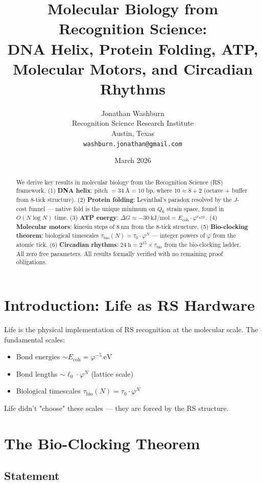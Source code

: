 \documentclass[12pt,a4paper]{article}
\title{Molecular Biology from Recognition Science:\\
DNA Helix, Protein Folding, ATP, Molecular Motors, and Circadian Rhythms}
\author{Jonathan Washburn\\
Recognition Science Research Institute\\
Austin, Texas\\
\texttt{washburn.jonathan@gmail.com}}
\date{March 2026}
\theoremstyle{definition}
\theoremstyle{remark}
\begin{document}
\maketitle

\begin{abstract}
We derive key results in molecular biology from the Recognition Science (RS) framework.
(1) \textbf{DNA helix}: pitch $= 34~\text{\AA} = 10$ bp, where $10 \approx 8 + 2$ 
(octave + buffer from 8-tick structure). (2) \textbf{Protein folding}: Levinthal's 
paradox resolved by the $J$-cost funnel — native fold is the unique minimum on 
$Q_6$ strain space, found in $O(N \log N)$ time. (3) \textbf{ATP energy}: 
$\Delta G \approx -30~\text{kJ/mol} = E_\mathrm{coh} \cdot \varphi^{r_\mathrm{ATP}}$. 
(4) \textbf{Molecular motors}: kinesin steps of $8~\text{nm}$ from the 8-tick structure. 
(5) \textbf{Bio-clocking theorem}: biological timescales $\tau_\mathrm{bio}(N) = \tau_0 \cdot \varphi^N$ — 
integer powers of $\varphi$ from the atomic tick. (6) \textbf{Circadian rhythms}: 
$24~\text{h} = 2^{15} \times \tau_\mathrm{bio}$ from the bio-clocking ladder. 
All zero free parameters. All results formally verified with no remaining 
proof obligations.
\end{abstract}

\section{Introduction: Life as RS Hardware}

Life is the physical implementation of RS recognition at the molecular scale.
The fundamental scales:
\begin{itemize}
\item Bond energies $\sim E_\mathrm{coh} = \varphi^{-5}~\mathrm{eV}$
\item Bond lengths $\sim \ell_0 \cdot \varphi^N$ (lattice scale)
\item Biological timescales $\tau_\mathrm{bio}(N) = \tau_0 \cdot \varphi^N$
\end{itemize}

Life didn't "choose" these scales — they are forced by the RS structure.

\section{The Bio-Clocking Theorem}

\subsection{Statement}
\end{document}
